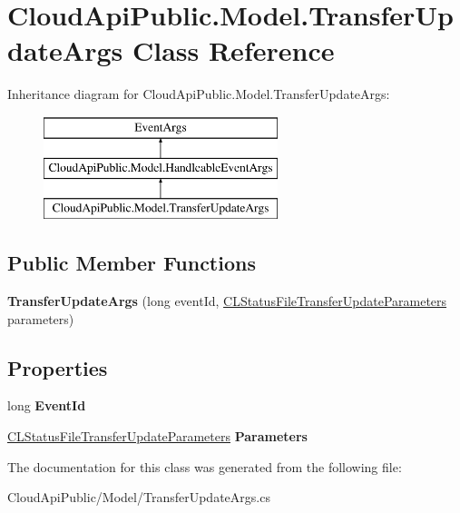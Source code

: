 \hypertarget{class_cloud_api_public_1_1_model_1_1_transfer_update_args}{\section{Cloud\-Api\-Public.\-Model.\-Transfer\-Update\-Args Class Reference}
\label{class_cloud_api_public_1_1_model_1_1_transfer_update_args}
}
Inheritance diagram for Cloud\-Api\-Public.\-Model.\-Transfer\-Update\-Args\-:\begin{figure}[H]
\begin{center}
\leavevmode
\includegraphics[height=3.000000cm]{class_cloud_api_public_1_1_model_1_1_transfer_update_args}
\end{center}
\end{figure}
\subsection*{Public Member Functions}
\begin{DoxyCompactItemize}
\item 
\hypertarget{class_cloud_api_public_1_1_model_1_1_transfer_update_args_ab1404b9c12d1335c70d32fc13fb3aebb}{{\bfseries Transfer\-Update\-Args} (long event\-Id, \hyperlink{struct_cloud_api_public_1_1_model_1_1_c_l_status_file_transfer_update_parameters}{C\-L\-Status\-File\-Transfer\-Update\-Parameters} parameters)}\label{class_cloud_api_public_1_1_model_1_1_transfer_update_args_ab1404b9c12d1335c70d32fc13fb3aebb}

\end{DoxyCompactItemize}
\subsection*{Properties}
\begin{DoxyCompactItemize}
\item 
\hypertarget{class_cloud_api_public_1_1_model_1_1_transfer_update_args_a01a4fb115eb0f78d3a5cbe8fdf8f6f50}{long {\bfseries Event\-Id}}\label{class_cloud_api_public_1_1_model_1_1_transfer_update_args_a01a4fb115eb0f78d3a5cbe8fdf8f6f50}

\item 
\hypertarget{class_cloud_api_public_1_1_model_1_1_transfer_update_args_aad6b2da2e778b31c814942bc0403f838}{\hyperlink{struct_cloud_api_public_1_1_model_1_1_c_l_status_file_transfer_update_parameters}{C\-L\-Status\-File\-Transfer\-Update\-Parameters} {\bfseries Parameters}}\label{class_cloud_api_public_1_1_model_1_1_transfer_update_args_aad6b2da2e778b31c814942bc0403f838}

\end{DoxyCompactItemize}


The documentation for this class was generated from the following file\-:\begin{DoxyCompactItemize}
\item 
Cloud\-Api\-Public/\-Model/Transfer\-Update\-Args.\-cs\end{DoxyCompactItemize}
